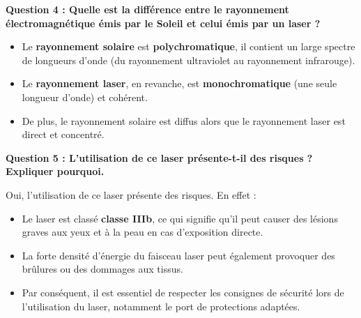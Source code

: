 \documentclass[a4paper,12pt]{article}
\begin{document}
\textbf{Question 4 : Quelle est la différence entre le rayonnement électromagnétique émis par le Soleil et celui émis par un laser ?}

\begin{itemize}[noitemsep]
    \item Le \textbf{rayonnement solaire} est \textbf{polychromatique}, il contient un large spectre de longueurs d'onde (du rayonnement ultraviolet au rayonnement infrarouge).
    \item Le \textbf{rayonnement laser}, en revanche, est \textbf{monochromatique} (une seule longueur d'onde) et cohérent.
    \item De plus, le rayonnement solaire est diffus alors que le rayonnement laser est direct et concentré.
\end{itemize}

\textbf{Question 5 : L'utilisation de ce laser présente-t-il des risques ? Expliquer pourquoi.}

Oui, l'utilisation de ce laser présente des risques. En effet :
\begin{itemize}[noitemsep]
    \item Le laser est classé \textbf{classe IIIb}, ce qui signifie qu'il peut causer des lésions graves aux yeux et à la peau en cas d'exposition directe.
    \item La forte densité d'énergie du faisceau laser peut également provoquer des brûlures ou des dommages aux tissus.
    \item Par conséquent, il est essentiel de respecter les consignes de sécurité lors de l'utilisation du laser, notamment le port de protections adaptées.
\end{itemize}
\end{document}
